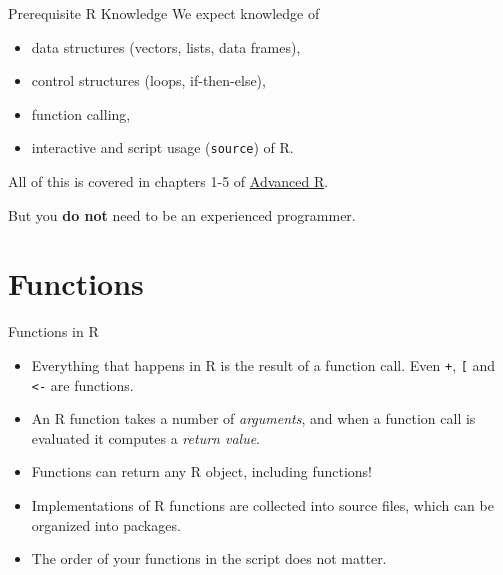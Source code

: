 \documentclass[
  ignorenonframetext,
  aspectratio=1610,
  onlytextwidth]{beamer}
\providecommand{\tightlist}{}
\begin{document}
\begin{frame}[fragile]{Prerequisite R Knowledge}
\label{prerequisite-r-knowledge}
We expect knowledge of

\begin{itemize}
\tightlist
\item
  data structures (vectors, lists, data frames),
\item
  control structures (loops, if-then-else),
\item
  function calling,
\item
  interactive and script usage (\texttt{source}) of R.
\end{itemize}

\pause

All of this is covered in chapters 1-5 of
\href{https://adv-r.hadley.nz/}{Advanced R}.

\medskip

But you \textbf{do not} need to be an experienced programmer.
\end{frame}

\section{Functions}\label{functions}

\begin{frame}[fragile]{Functions in R}
\label{functions-in-r}
\begin{itemize}
\tightlist
\item
  Everything that happens in R is the result of a function call. Even
  \texttt{+}, \texttt{{[}} and \texttt{\textless{}-} are functions.
\item
  An R function takes a number of \emph{arguments}, and when a function
  call is evaluated it computes a \emph{return value}.
\item
  Functions can return any R object, including functions!
\item
  Implementations of R functions are collected into source files, which
  can be organized into packages.
\item
  The order of your functions in the script does not matter.
\end{itemize}
\end{frame}
\end{document}
